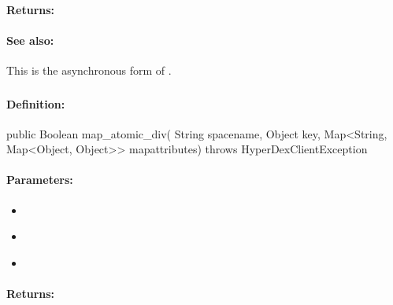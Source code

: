 \paragraph{Returns:}


\paragraph{See also:}  This is the asynchronous form of .

\pagebreak
\subsubsection{}
\label{api:java:map_atomic_div}


\paragraph{Definition:}
\begin{javacode}
public Boolean map_atomic_div(
        String spacename,
        Object key,
        Map<String, Map<Object, Object>> mapattributes) throws HyperDexClientException
\end{javacode}

\paragraph{Parameters:}
\begin{itemize}[noitemsep]
\item {}\\

\item {}\\

\item {}\\

\end{itemize}

\paragraph{Returns:}


